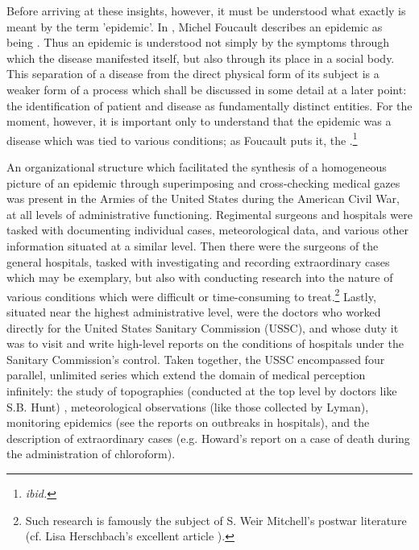 \documentclass[12pt]{article}
\begin{document}
Before arriving at these insights, however, it must be understood what exactly is meant by the term 'epidemic'. In ,
Michel Foucault describes an epidemic as being .\autocite[23]{Foucault1994} Thus an epidemic is understood not simply by the symptoms through which the disease
manifested itself, but also through its place in a social body. This separation of a disease from the direct physical form of its subject
is a weaker form of a process which shall be discussed in some detail at a later point: the identification of patient and disease
as fundamentally distinct entities. For the moment, however, it is important only to understand that the epidemic was a disease which was
tied to various conditions; as Foucault puts it, the .\footnote{\textit{ibid.}}

An organizational structure which facilitated the synthesis of a homogeneous picture of an epidemic through superimposing and cross-checking
medical gazes was present in the Armies of the United States during the American Civil War, at all levels of administrative functioning.
Regimental surgeons and hospitals were tasked with documenting individual cases, meteorological data, and various other information situated at
a similar level. Then there were the surgeons of the general hospitals, tasked with investigating and recording extraordinary cases which may be
exemplary, but also with conducting research into the nature of various conditions which were difficult or time-consuming to treat.\footnote{Such research is famously
	the subject of S. Weir Mitchell's postwar literature (cf. Lisa Herschbach's excellent article ).} Lastly,
situated near the highest administrative level, were the doctors who worked directly for the United States Sanitary Commission (USSC),
and whose duty it was to  visit and write high-level
reports on the conditions of hospitals under the Sanitary Commission’s control. Taken together, the USSC encompassed four parallel, unlimited series
which extend the domain of medical perception infinitely: the study of topographies (conducted at the top level by doctors like S.B. Hunt)
\autocite{ussc:6:882}, meteorological observations (like those collected by Lyman)\autocite{ussc:6:775}, monitoring epidemics (see the reports on
outbreaks in hospitals)\autocite{ussc:10:1523}, and the description of extraordinary cases (e.g. Howard’s report on a case of death during the
administration of chloroform).\autocite{ussc:9:1340}
\end{document}
